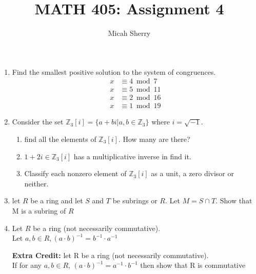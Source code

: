 \documentclass{article}
\title{MATH 405: Assignment 4}
\author{Micah Sherry}
\newcommand{\Z}{\mathbb{Z}}
\begin{document}
	\maketitle
	\begin{enumerate}
		\item Find the smallest positive solution to the system of congruences.
		\begin{align*}
			x &\equiv 4 \bmod{7}\\
			x &\equiv 5 \bmod{11}\\
			x &\equiv 2 \bmod{16}\\
			x &\equiv 1 \bmod{19}
		\end{align*}
		
		\item Consider the set $\Z_3[i] = \{ a+bi |a,b \in \Z_3 \}$ where $i = \sqrt{-1}$.
		\begin{enumerate}
			\item find all the elements of $\Z_3[i]$. How many are there?
			\item $1+2i \in \Z_3[i] $ has a multiplicative inverse in find it.
			\item Classify each nonzero element of $\Z_3[i]$ as a unit, a zero divisor or neither. 
		\end{enumerate}
		
		\item let $R$ be a ring and let $S$ and $T$ be subrings or $R$. Let $M = S \cap T$. Show that M is a subring of $R$ 
		
		\item Let $R$ be a ring (not necessarily commutative). \\
		Let $a,b \in R, (a \cdot b)^{-1} = b^{-1} \cdot a^{-1}$
		
		
		\textbf{Extra Credit:}
		let R be a ring (not necessarily commutative).\\
		If for any $a,b \in R$, $(a\cdot b)^{-1} = a^{-1} \cdot b^{-1}$ then show that R is commutative 
	\end{enumerate}
\end{document}

